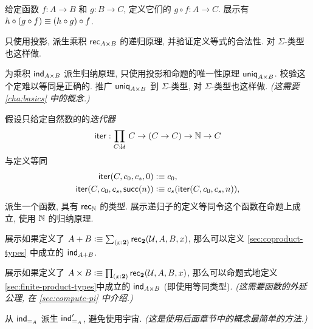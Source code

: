 \sectionExercises

\begin{ex}
    \label{ex:composition}
    给定函数 $f:A\to B$ 和 $g:B\to C$, 定义它们的
    $g\circ f:A\to C$.
    展示有 $h \circ (g\circ f) \equiv (h\circ g)\circ f$.
\end{ex}

\begin{ex}
    \label{ex:pr-to-rec}
    只使用投影, 派生乘积 $\mathsf{rec}_{A\times B} $ 的递归原理, 并验证定义等式的合法性.
    对 $\Sigma$-类型也这样做.
\end{ex}

\begin{ex}
    \label{ex:pr-to-ind}
    为乘积 $\mathsf{ind}_{A\times B}$ 派生归纳原理, 只使用投影和命题的唯一性原理 $\mathsf{uniq}_{A\times B}$.
    校验这个定难以等同是正确的.
    推广 $\mathsf{uniq}_{A\times B}$ 到 $\Sigma$-类型, 对 $\Sigma$-类型也这样做.
    \emph{(这需要 \cref{cha:basics} 中的概念.)}
\end{ex}

\begin{ex}
    \label{ex:iterator}
    假设只给定自然数的的\emph{迭代器}
    \[\ite : \prd{C:\UU} C \to (C \to C) \to \nat \to C \]
    与定义等同
    \begin{align*}
        \mathsf{iter}(C,c_0,c_s,0)  &\vcentcolon\equiv c_0, \\
        \mathsf{iter}(C,c_0,c_s,\mathsf{succ}(n)) &\vcentcolon\equiv c_s(\mathsf{iter}(C,c_0,c_s,n)),
    \end{align*}
    派生一个函数, 具有 $\mathsf{rec}_{\mathbb{N}}$ 的类型.
    展示递归子的定义等同令这个函数在命题上成立, 使用 $\mathbb{N}$ 的归纳原理.
\end{ex}

\begin{ex}
    \label{ex:sum-via-bool}
    展示如果定义了 $A + B \defeq \sm{x:\bool} \rec{\bool}(\UU,A,B,x)$, 那么可以定义 \cref{sec:coproduct-types} 中成立的 $\mathsf{ind}_{A+B}$.
\end{ex}

\begin{ex}
    \label{ex:prod-via-bool}
    展示如果定义了 $A \times B \defeq \prd{x:\bool}\rec{\bool}(\UU,A,B,x)$, 那么可以命题式地定义\cref{sec:finite-product-types}中成立的 $\mathsf{ind}_{A\times B}$ (即使用等同类型).
    \emph{(这需要函数的外延公理, 在 \cref{sec:compute-pi} 中介绍.)}
\end{ex}

\begin{ex}
    \label{ex:pm-to-ml}
    从 $\mathsf{ind}_{=_{A}}$ 派生 $\mathsf{ind}_{=_{A}}'$, 避免使用宇宙.
    \emph{(这是使用后面章节中的概念最简单的方法.)}
\end{ex}

